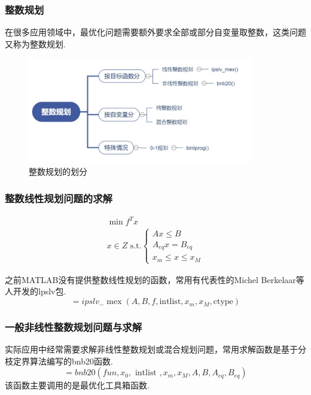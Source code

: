\documentclass{beamer}
\begin{document}
\begin{CJK}{UTF8}{song}

\begin{frame}[allowframebreaks]
\frametitle{整数规划}

在很多应用领域中，最优化问题需要额外要求全部或部分自变量取整数，这类问题又称为整数规划.
\begin{figure}
\centering
\includegraphics[width=0.88\textwidth]{zsgh.jpg}
\caption{整数规划的划分}
\end{figure}
\end{frame}

\begin{frame}[allowframebreaks]
\frametitle{整数线性规划问题的求解}

\begin{equation}
\begin{array}{c}
\min f^{T} x \\
x \in Z \text { s.t.}\left\{\begin{array}{c}
A x \leq B \\
A_{e q} x=B_{e q} \\
x_{m} \leq x \leq x_{M}
\end{array}\right.
\end{array}
\end{equation}

之前MATLAB没有提供整数线性规划的函数，常用有代表性的Michel Berkelaar等人开发的lpslv包.
\begin{equation}
[x, h o w]=i p s l v_{-} \operatorname{mex}\left(A, B, f, \text {intlist}, x_{m}, x_{M}, \text {ctype}\right)
\end{equation}
\end{frame}

\begin{frame}[allowframebreaks]
\frametitle{一般非线性整数规划问题与求解}

实际应用中经常需要求解非线性整数规划或混合规划问题，常用求解函数是基于分枝定界算法编写的bnb20函数.
\begin{equation}
[e r r, f, x]=b n b 20\left(f u n, x_{0}, \text { intlist }, x_{m}, x_{M}, A, B, A_{e q}, B_{e q}\right)
\end{equation}
该函数主要调用的是最优化工具箱函数.
\end{frame}


\end{CJK}
\end{document}
